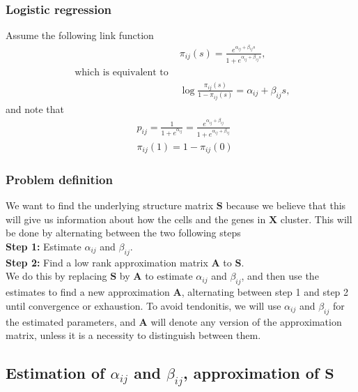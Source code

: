 \documentclass[12pt]{article}
\begin{document}
\subsubsection*{Logistic regression} %
Assume the following link function 
\begin{align} \label{eq:Link}
  & \pi_{ij}(s) = \frac{e^{\alpha_{ij} + \beta_{ij} s}}{1 + e^{\alpha_{ij} + \beta_{ij} s}}, \\
 \text{ which is equivalent to } \nonumber \\
  & \log \frac{\pi_{ij}(s)}{1-\pi_{ij}(s)}  = \alpha_{ij} + \beta_{ij} s,  \nonumber
\end{align}
and note that
\begin{align} \label{eq:p_alpha_pi}
  & p_{ij} =  \frac{1}{1 + e^{\alpha_{ij}}} =  \frac{e^{\alpha_{ij} + \beta_{ij}}}{1 + e^{\alpha_{ij} + \beta_{ij}}} \\
  & \pi_{ij}(1)  = 1 - \pi_{ij}(0) \nonumber
\end{align}

\subsubsection*{Problem definition} %
We want to find the underlying structure matrix $\mathbf{S}$ because we believe that this will give us information about how the cells and the genes in $\mathbf{X}$ cluster. 
This will be done by alternating between the two following steps \\
{\bf Step 1:}  Estimate $\alpha_{ij}$ and $\beta_{ij}$. \\
{\bf Step 2:} Find a low rank approximation matrix $\mathbf{A}$ to $\mathbf{S}$. \\
We do this by replacing $\mathbf{S}$ by $\mathbf{A}$ to estimate $\alpha_{ij}$ and $\beta_{ij}$, and then use the estimates to find a new approximation $\mathbf{A}$, alternating between step 1 and step 2 until convergence or exhaustion. 
To avoid tendonitis, we will use $\alpha_{ij}$ and $\beta_{ij}$ for the estimated parameters, and $\mathbf{A}$ will denote any version of the approximation matrix, unless it is a necessity to distinguish between them. 

\subsection{Estimation of $\alpha_{ij}$ and $\beta_{ij}$, approximation of $\mathbf{S}$} %
\end{document}
